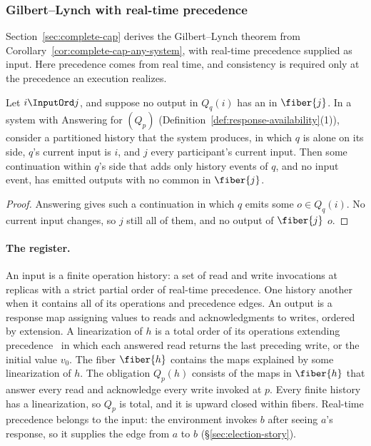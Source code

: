 \subsubsection{Gilbert--Lynch with real-time precedence}

Section~\ref{sec:complete-cap} derives the Gilbert--Lynch theorem from
Corollary~\ref{cor:complete-cap-any-system}, with real-time precedence supplied
as input.  Here precedence comes from real time, and consistency is required
only at the precedence an execution realizes.

\begin{lemma}
\label{lem:forced-answer}
Let $i\InputOrd j$, and suppose no output in $Q_q(i)$ has an \outnoun in
$\fiber{j}$.  In a system with Answering for $(Q_p)$
(Definition~\ref{def:response-availability}(1)), consider a partitioned
history that the system produces, in which $q$ is alone on its side,
$q$'s current input is $i$, and $j$ \inrel every participant's current input.
Then some continuation within $q$'s side that adds only history events of $q$,
and no input event, has emitted outputs with no common \outnoun in
$\fiber{j}$.
\end{lemma}

\begin{proof}
Answering gives such a continuation in which $q$ emits some $o\in Q_q(i)$.  No
current input changes, so $j$ still \inrel all of them, and no output of
$\fiber{j}$ \outrel $o$.
\end{proof}

\paragraph{The register.}
An input is a finite operation history: a set of read and write invocations at
replicas with a strict partial order of real-time precedence.  One history
\inrel another when it contains all of its operations and precedence edges.
An output is a response map assigning values to reads and acknowledgments to
writes, ordered by extension.  A linearization of $h$ is a total order of its
operations extending precedence~\cite{herlihy1990linearizability} in which
each answered read returns the last preceding write, or the initial value
$v_0$.  The fiber $\fiber{h}$ contains the maps explained by some
linearization of $h$.  The obligation $Q_p(h)$ consists of the maps in
$\fiber{h}$ that answer every read and acknowledge every write invoked at $p$.
Every finite history has a linearization, so $Q_p$ is total, and it is upward
closed within fibers.  Real-time precedence belongs to the input: the
environment invokes $b$ after seeing $a$'s response, so it supplies the edge
from $a$ to $b$ (\S\ref{sec:election-story}).

